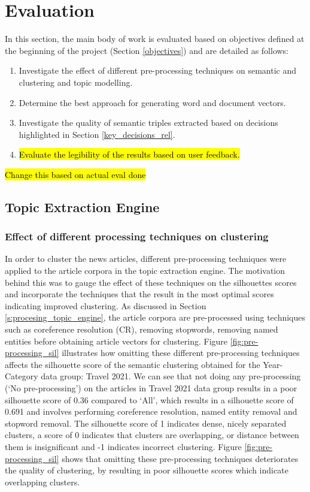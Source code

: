 \chapter{Evaluation}   \label{ch:6:eval}

In this section, the main body of work is evaluated based on objectives defined at the beginning of the project (Section \ref{objectives}) and are detailed as follows:
\begin{enumerate}
    \item Investigate the effect of different pre-processing techniques on semantic and clustering and topic modelling.
    \item Determine the best approach for generating word and document vectors.
    \item Investigate the quality of semantic triples extracted based on decisions highlighted in Section \ref{key_decisions_rel}.
    \item \hl{Evaluate the legibility of the results based on user feedback.}
\end{enumerate}

\hl{Change this based on actual eval done}

\section{Topic Extraction Engine} \label{s:evaluation_topic_extraction}

\subsection{Effect of different processing techniques on clustering} \label{s:preprocess_clustering}

In order to cluster the news articles, different pre-processing techniques were applied to the article corpora in the topic extraction engine. The motivation behind this was to gauge the effect of these techniques on the silhouettes scores and incorporate the techniques that the result in the most optimal scores indicating improved clustering. As discussed in Section \ref{s:procesing_topic_engine}, the article corpora are pre-processed using techniques such as coreference resolution (CR), removing stopwords, removing named entities before obtaining article vectors for clustering. Figure \ref{fig:pre-processing_sil} illustrates how omitting these different pre-processing techniques affects the silhouette score of the semantic clustering obtained for the Year-Category data group: Travel 2021. We can see that not doing any pre-processing (`No pre-processing') on the articles in Travel 2021 data group results in a poor silhouette score of 0.36 compared to `All', which results in a silhouette score of 0.691 and involves performing coreference resolution, named entity removal and stopword removal. The silhouette score of 1 indicates dense, nicely separated clusters, a score of 0 indicates that clusters are overlapping, or distance between them is insignificant and -1 indicates incorrect clustering. Figure  \ref{fig:pre-processing_sil} shows that omitting these pre-processing techniques deteriorates the quality of clustering, by resulting in poor silhouette scores which indicate overlapping clusters.

